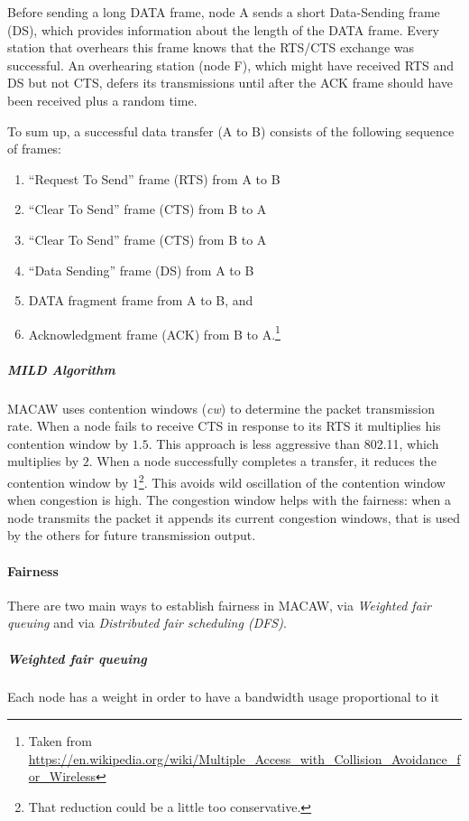 Before sending a long DATA frame, node A sends a short Data-Sending frame (DS),
which provides information about the length of the DATA frame. Every station
that overhears this frame knows that the RTS/CTS exchange was successful. An
overhearing station (node F), which might have received RTS and DS but not CTS,
defers its transmissions until after the ACK frame should have been received
plus a random time.

To sum up, a successful data transfer (A to B) consists of the following
sequence of frames:
\begin{enumerate}
\item ``Request To Send'' frame (RTS) from A to B
\item ``Clear To Send'' frame (CTS) from B to A
\item ``Clear To Send'' frame (CTS) from B to A
\item ``Data Sending'' frame (DS) from A to B
\item DATA fragment frame from A to B, and
\item Acknowledgment frame (ACK) from B to A.\footnote{
Taken from
\url{https://en.wikipedia.org/wiki/Multiple_Access_with_Collision_Avoidance_for_Wireless}
}
\end{enumerate}

\subparagraph*{MILD Algorithm} MACAW uses contention windows (\textit{cw}) to
determine the packet transmission rate. When a node fails to receive CTS in
response to its RTS it multiplies his contention window by $1.5$. This approach
is less aggressive than 802.11, which multiplies by $2$. When a node
successfully completes a transfer, it reduces the contention window by
$1$\footnote{That reduction could be a little too conservative.}. This avoids
wild oscillation of the contention window when congestion is high.
The congestion window helps with the fairness: when a node transmits the
packet it appends its current congestion windows, that is used by the others
for future transmission output.

\paragraph*{Fairness}
There are two main ways to establish fairness in MACAW, via \textit{Weighted
  fair queuing} and via \textit{Distributed fair scheduling (DFS)}.

\subparagraph*{Weighted fair queuing} Each node has a weight in order to have a
bandwidth usage proportional to it


